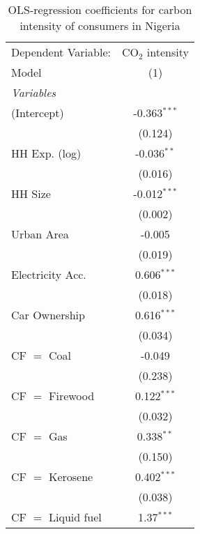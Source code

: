 
\begin{table}[htbp!]
   \centering
   \small
   \begin{adjustbox}{width = 1\textwidth, max height = 0.95\textheight, center}
      \begin{threeparttable}[b]
         \caption{\label{tab:OLS_1_NGA} OLS-regression coefficients for carbon intensity of consumers in Nigeria}
         \begin{tabular}{lc}
            \tabularnewline \midrule \midrule
            Dependent Variable: & CO$_{2}$ intensity\\  
            Model               & (1)\\  
            \midrule
            \emph{Variables}\\
            (Intercept)         & -0.363$^{***}$\\   
                                & (0.124)\\   
            HH Exp. (log)       & -0.036$^{**}$\\   
                                & (0.016)\\   
            HH Size             & -0.012$^{***}$\\   
                                & (0.002)\\   
            Urban Area          & -0.005\\   
                                & (0.019)\\   
            Electricity Acc.    & 0.606$^{***}$\\   
                                & (0.018)\\   
            Car Ownership       & 0.616$^{***}$\\   
                                & (0.034)\\   
            CF $=$ Coal         & -0.049\\   
                                & (0.238)\\   
            CF $=$ Firewood     & 0.122$^{***}$\\   
                                & (0.032)\\   
            CF $=$ Gas          & 0.338$^{**}$\\   
                                & (0.150)\\   
            CF $=$ Kerosene     & 0.402$^{***}$\\   
                                & (0.038)\\   
            CF $=$ Liquid fuel  & 1.37$^{***}$\\   

\end{tabular}
\end{threeparttable}
\end{adjustbox}
\end{table}
